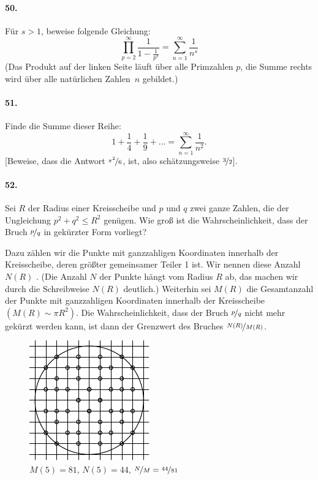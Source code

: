 \documentclass[10pt,a5paper,twoside]{article}
\newenvironment{problem}[1]{\paragraph*{#1}}{}
\begin{document}
\begin{problem}{50.}
	Für $s>1$, beweise folgende Gleichung:
	\begin{equation*}
	\textstyle\prod\limits_{p=2}^{\infty} \frac{1}{1-\frac{1}{p^s}}=\textstyle\sum\limits_{n=1}^{\infty} \frac{1}{n^s}
	\end{equation*}
	(Das Produkt auf der linken Seite läuft über alle Primzahlen $p$, die Summe rechts wird über alle natürlichen Zahlen~$n$ gebildet.)
\end{problem}

\begin{problem}{51.}
	Finde die Summe dieser Reihe:
	\begin{equation*}
	1+ \frac{1}{4}+ \frac{1}{9}+\dots=\textstyle\sum\limits_{n=1}^{\infty} \frac{1}{n^2}.
	\end{equation*}
	[Beweise, dass die Antwort $\nicefrac{\pi^2}{6}$, ist, also schätzungsweise $\nicefrac{3}{2}$].
\end{problem}

\begin{problem}{52.}
	Sei $R$ der Radius einer Kreisscheibe und $p$ und $q$ zwei ganze Zahlen, die der Ungleichung $p^2+q^2 \leqslant R^2$ genügen. Wie groß ist die Wahrscheinlichkeit, dass der Bruch $\nicefrac{p}{q}$ in gekürzter Form vorliegt?
	
	Dazu zählen wir die Punkte mit ganzzahligen Koordinaten innerhalb der Kreis\-schei\-be, deren größter gemeinsamer Teiler 1 ist. Wir nennen diese Anzahl $N(R)$ . (Die Anzahl $N$ der Punkte hängt vom Radius $R$ ab, das machen wir durch die Schreibweise $N(R)$ deutlich.)  Weiterhin sei $M(R)$ die Gesamtanzahl der Punkte mit ganzzahligen Koordinaten innerhalb der Kreisscheibe $(M(R) \sim \pi R^2)$. Die Wahrscheinlichkeit, dass der Bruch $\nicefrac{p}{q}$ nicht mehr gekürzt werden kann, ist dann der Grenzwert des Bruches $\nicefrac{N(R)}{M(R)}$.
	\begin{figure}[H]
	\footnotesize
	\centering
	\includegraphics{taskbook-36}\\
	$M(5)=81$, $N(5)=44$, $\nicefrac{N}{M} = \nicefrac{44}{81}$
	\end{figure}
\end{problem}
\end{document}
